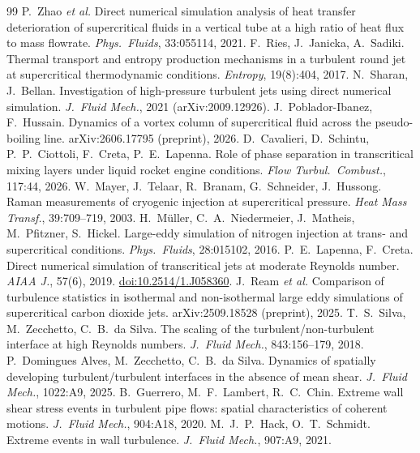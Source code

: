 \documentclass[11pt]{article}
\begin{document}
\begin{thebibliography}{99}
 P.\ Zhao \emph{et al.} Direct numerical simulation analysis of heat transfer deterioration of supercritical fluids in a vertical tube at a high ratio of heat flux to mass flowrate. \emph{Phys.\ Fluids}, 33:055114, 2021.
 F.\ Ries, J.\ Janicka, A.\ Sadiki. Thermal transport and entropy production mechanisms in a turbulent round jet at supercritical thermodynamic conditions. \emph{Entropy}, 19(8):404, 2017.
 N.\ Sharan, J.\ Bellan. Investigation of high-pressure turbulent jets using direct numerical simulation. \emph{J.\ Fluid Mech.}, 2021 (arXiv:2009.12926).
 J.\ Poblador-Ibanez, F.\ Hussain. Dynamics of a vortex column of supercritical fluid across the pseudo-boiling line. arXiv:2606.17795 (preprint), 2026.
 D.\ Cavalieri, D.\ Schintu, P.\ P.\ Ciottoli, F.\ Creta, P.\ E.\ Lapenna. Role of phase separation in transcritical mixing layers under liquid rocket engine conditions. \emph{Flow Turbul.\ Combust.}, 117:44, 2026.
 W.\ Mayer, J.\ Telaar, R.\ Branam, G.\ Schneider, J.\ Hussong. Raman measurements of cryogenic injection at supercritical pressure. \emph{Heat Mass Transf.}, 39:709--719, 2003.
 H.\ M\"uller, C.\ A.\ Niedermeier, J.\ Matheis, M.\ Pfitzner, S.\ Hickel. Large-eddy simulation of nitrogen injection at trans- and supercritical conditions. \emph{Phys.\ Fluids}, 28:015102, 2016.
 P.\ E.\ Lapenna, F.\ Creta. Direct numerical simulation of transcritical jets at moderate Reynolds number. \emph{AIAA J.}, 57(6), 2019. \href{https://doi.org/10.2514/1.J058360}{doi:10.2514/1.J058360}.
 J.\ Ream \emph{et al.} Comparison of turbulence statistics in isothermal and non-isothermal large eddy simulations of supercritical carbon dioxide jets. arXiv:2509.18528 (preprint), 2025.
 T.\ S.\ Silva, M.\ Zecchetto, C.\ B.\ da Silva. The scaling of the turbulent/non-turbulent interface at high Reynolds numbers. \emph{J.\ Fluid Mech.}, 843:156--179, 2018.
 P.\ Domingues Alves, M.\ Zecchetto, C.\ B.\ da Silva. Dynamics of spatially developing turbulent/turbulent interfaces in the absence of mean shear. \emph{J.\ Fluid Mech.}, 1022:A9, 2025.
 B.\ Guerrero, M.\ F.\ Lambert, R.\ C.\ Chin. Extreme wall shear stress events in turbulent pipe flows: spatial characteristics of coherent motions. \emph{J.\ Fluid Mech.}, 904:A18, 2020.
 M.\ J.\ P.\ Hack, O.\ T.\ Schmidt. Extreme events in wall turbulence. \emph{J.\ Fluid Mech.}, 907:A9, 2021.

\end{thebibliography}
\end{document}
